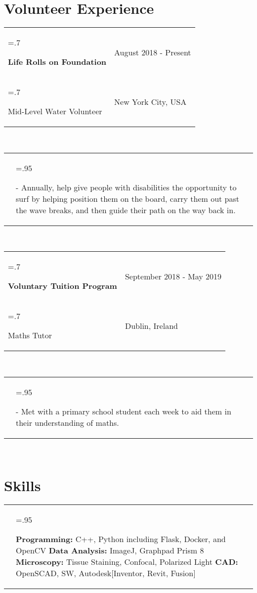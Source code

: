 \documentclass[letterpaper,11pt]{article}
\newcommand{\itemHeadings}[4]{
    \begin{tabularx}{\textwidth} {>{\hsize=.7\textwidth\raggedright\arraybackslash}X 
   >{\raggedleft\arraybackslash}X}
      #1 & \small#2 \\
      #3 & \small#4
    \end{tabularx}
    \\
}
\newcommand{\itemitems}[1]{
    \begin{tabularx}{\textwidth} {>{\raggedleft\arraybackslash}X >{\hsize=.95\textwidth\raggedright\arraybackslash}X}
      &- \small#1 \\
    \end{tabularx}
    \\
}
\newcommand{\projitems}[1]{
    \begin{tabularx}{\textwidth} {>{\raggedleft\arraybackslash}X | >{\hsize=.95\textwidth\raggedright\arraybackslash}X}
      & \small#1 \\
    \end{tabularx}
     \\
}
\begin{document}
\section*{Volunteer Experience}
    \itemHeadings
          {\textbf{Life Rolls on Foundation}}
          {August 2018 - Present}
          {Mid-Level Water Volunteer}
          {New York City, USA}
        \itemitems
            {Annually, help give people with disabilities the opportunity to surf by helping position them on the board, carry them out past the wave breaks, and then guide their path on the way back in.}
    \itemHeadings
          {\textbf{Voluntary Tuition Program}}
          {September 2018 - May 2019}
          {Maths Tutor}
          {Dublin, Ireland}
        \itemitems
            {Met with a primary school student each week to aid them in their understanding of maths.} 

\section*{Skills}
    \projitems
        {\textbf{Programming:} C++, Python including Flask, Docker, and OpenCV \textbf{Data Analysis:} ImageJ, Graphpad Prism 8 \newline \textbf{Microscopy:} Tissue Staining, Confocal, Polarized Light \textbf{CAD:} OpenSCAD, SW,  Autodesk[Inventor, Revit, Fusion]}


\end{document}
